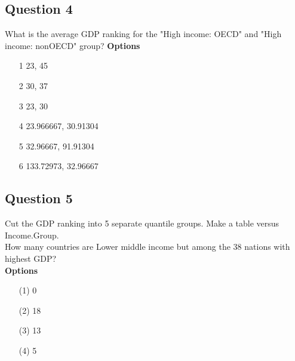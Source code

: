 \documentclass[]{article}
\begin{document}
\subsection*{Question 4}
What is the average GDP ranking for the "High income: OECD" and "High income: nonOECD" group?
\textbf{Options}
\begin{itemize}
\item[1]  23, 45
\item[2] 30, 37
\item[3] 23, 30
\item[4] 23.966667, 30.91304
\item[5] 32.96667, 91.91304
\item[6] 133.72973, 32.96667
\end{itemize}
\newpage
\subsection*{Question 5}
Cut the GDP ranking into 5 separate quantile groups. Make a table versus Income.Group.
\\
 How many countries are Lower middle income but among the 38 nations with highest GDP?\\
\bigskip
\textbf{Options}
\begin{itemize}
\item[(1)] 0
\item[(2)]18
\item[(3)]13
\item[(4)] 5
\end{itemize}
\end{document}
